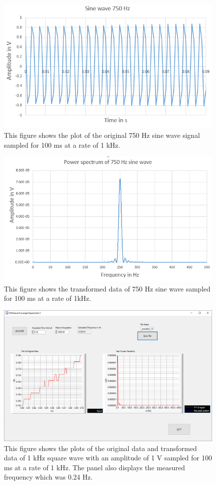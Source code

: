 \documentclass{article}
\begin{document}
\begin{figure}[H]
\includegraphics[scale=0.7,center]{Signal750.PNG}
\caption{This figure shows the plot of the original 750 Hz sine wave signal sampled for 100 ms at a rate of 1 kHz.}
\end{figure}

\begin{figure}[H]
\includegraphics[scale=0.7,center]{Fourier750.PNG}
\caption{This figure shows the transformed data of 750 Hz sine wave sampled for 100 ms at a rate of 1kHz.}
\end{figure}

\begin{figure}[H]
\includegraphics[scale=0.4,center]{2xNyquist.png}
\caption{This figure shows the plots of the original data and transformed data of 1 kHz square wave with an amplitude of 1 V sampled for 100 ms at a rate of 1 kHz.  The panel also displays the measured frequency which was 0.24 Hz.}
\end{figure}
\end{document}
